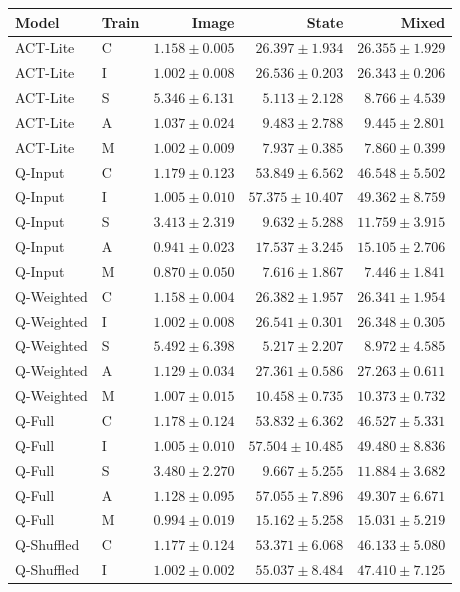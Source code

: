 \documentclass[11pt,a4paper]{article}
\begin{document}
\begin{center}
\footnotesize
\begin{tabular}{llrrr}
\toprule
Model & Train & Image & State & Mixed \\
\midrule
ACT-Lite & C & $1.158\pm0.005$ & $26.397\pm1.934$ & $26.355\pm1.929$ \\
ACT-Lite & I & $1.002\pm0.008$ & $26.536\pm0.203$ & $26.343\pm0.206$ \\
ACT-Lite & S & $5.346\pm6.131$ & $5.113\pm2.128$ & $8.766\pm4.539$ \\
ACT-Lite & A & $1.037\pm0.024$ & $9.483\pm2.788$ & $9.445\pm2.801$ \\
ACT-Lite & M & $1.002\pm0.009$ & $7.937\pm0.385$ & $7.860\pm0.399$ \\
Q-Input & C & $1.179\pm0.123$ & $53.849\pm6.562$ & $46.548\pm5.502$ \\
Q-Input & I & $1.005\pm0.010$ & $57.375\pm10.407$ & $49.362\pm8.759$ \\
Q-Input & S & $3.413\pm2.319$ & $9.632\pm5.288$ & $11.759\pm3.915$ \\
Q-Input & A & $0.941\pm0.023$ & $17.537\pm3.245$ & $15.105\pm2.706$ \\
Q-Input & M & $0.870\pm0.050$ & $7.616\pm1.867$ & $7.446\pm1.841$ \\
Q-Weighted & C & $1.158\pm0.004$ & $26.382\pm1.957$ & $26.341\pm1.954$ \\
Q-Weighted & I & $1.002\pm0.008$ & $26.541\pm0.301$ & $26.348\pm0.305$ \\
Q-Weighted & S & $5.492\pm6.398$ & $5.217\pm2.207$ & $8.972\pm4.585$ \\
Q-Weighted & A & $1.129\pm0.034$ & $27.361\pm0.586$ & $27.263\pm0.611$ \\
Q-Weighted & M & $1.007\pm0.015$ & $10.458\pm0.735$ & $10.373\pm0.732$ \\
Q-Full & C & $1.178\pm0.124$ & $53.832\pm6.362$ & $46.527\pm5.331$ \\
Q-Full & I & $1.005\pm0.010$ & $57.504\pm10.485$ & $49.480\pm8.836$ \\
Q-Full & S & $3.480\pm2.270$ & $9.667\pm5.255$ & $11.884\pm3.682$ \\
Q-Full & A & $1.128\pm0.095$ & $57.055\pm7.896$ & $49.307\pm6.671$ \\
Q-Full & M & $0.994\pm0.019$ & $15.162\pm5.258$ & $15.031\pm5.219$ \\
Q-Shuffled & C & $1.177\pm0.124$ & $53.371\pm6.068$ & $46.133\pm5.080$ \\
Q-Shuffled & I & $1.002\pm0.002$ & $55.037\pm8.484$ & $47.410\pm7.125$ \\

\end{tabular}
\end{center}
\end{document}
